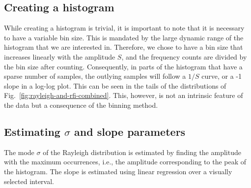 \documentclass[useAMS,usenatbib]{mn2e}
\begin{document}
\subsection{Creating a histogram} \label{sec:histogram}
While creating a histogram is trivial, it is important to note that it is necessary to have a variable bin size. This is mandated by the large dynamic range of the histogram that we are interested in. Therefore, we chose to have a bin size that increases linearly with the amplitude $S$, and the frequency counts are divided by the bin size after counting. Consequently, in parts of the histogram that have a sparse number of samples, the outlying samples will follow a $1/S$ curve, or a -1 slope in a log-log plot. This can be seen in the tails of the distributions of Fig.~\ref{fig:rayleigh-and-rfi-combined}. This, however, is not an intrinsic feature of the data but a consequence of the binning method.

\subsection{Estimating $\sigma$ and slope parameters}
The mode $\sigma$ of the Rayleigh distribution is estimated by finding the amplitude with the maximum occurrences, i.e., the amplitude corresponding to the peak of the histogram. The slope is estimated using linear regression over a visually selected interval.
\end{document}
